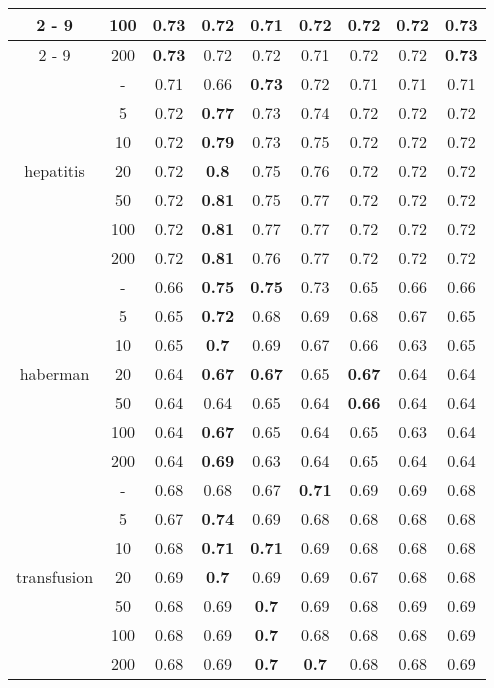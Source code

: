\documentclass{article}%
\begin{document}
\begin{longtable}{c|c|ccccccc}
\cline{2%
-%
9}%
&100&\textbf{0.73}&0.72&0.71&0.72&0.72&0.72&\textbf{0.73}\\%
\cline{2%
-%
9}%
&200&\textbf{0.73}&0.72&0.72&0.71&0.72&0.72&\textbf{0.73}\\%
\hline%
\multirow{7}{*}{hepatitis}&{-}&0.71&0.66&\textbf{0.73}&0.72&0.71&0.71&0.71\\%
\cline{2%
-%
9}%
&5&0.72&\textbf{0.77}&0.73&0.74&0.72&0.72&0.72\\%
\cline{2%
-%
9}%
&10&0.72&\textbf{0.79}&0.73&0.75&0.72&0.72&0.72\\%
\cline{2%
-%
9}%
&20&0.72&\textbf{0.8}&0.75&0.76&0.72&0.72&0.72\\%
\cline{2%
-%
9}%
&50&0.72&\textbf{0.81}&0.75&0.77&0.72&0.72&0.72\\%
\cline{2%
-%
9}%
&100&0.72&\textbf{0.81}&0.77&0.77&0.72&0.72&0.72\\%
\cline{2%
-%
9}%
&200&0.72&\textbf{0.81}&0.76&0.77&0.72&0.72&0.72\\%
\hline%
\multirow{7}{*}{haberman}&{-}&0.66&\textbf{0.75}&\textbf{0.75}&0.73&0.65&0.66&0.66\\%
\cline{2%
-%
9}%
&5&0.65&\textbf{0.72}&0.68&0.69&0.68&0.67&0.65\\%
\cline{2%
-%
9}%
&10&0.65&\textbf{0.7}&0.69&0.67&0.66&0.63&0.65\\%
\cline{2%
-%
9}%
&20&0.64&\textbf{0.67}&\textbf{0.67}&0.65&\textbf{0.67}&0.64&0.64\\%
\cline{2%
-%
9}%
&50&0.64&0.64&0.65&0.64&\textbf{0.66}&0.64&0.64\\%
\cline{2%
-%
9}%
&100&0.64&\textbf{0.67}&0.65&0.64&0.65&0.63&0.64\\%
\cline{2%
-%
9}%
&200&0.64&\textbf{0.69}&0.63&0.64&0.65&0.64&0.64\\%
\hline%
\multirow{7}{*}{transfusion}&{-}&0.68&0.68&0.67&\textbf{0.71}&0.69&0.69&0.68\\%
\cline{2%
-%
9}%
&5&0.67&\textbf{0.74}&0.69&0.68&0.68&0.68&0.68\\%
\cline{2%
-%
9}%
&10&0.68&\textbf{0.71}&\textbf{0.71}&0.69&0.68&0.68&0.68\\%
\cline{2%
-%
9}%
&20&0.69&\textbf{0.7}&0.69&0.69&0.67&0.68&0.68\\%
\cline{2%
-%
9}%
&50&0.68&0.69&\textbf{0.7}&0.69&0.68&0.69&0.69\\%
\cline{2%
-%
9}%
&100&0.68&0.69&\textbf{0.7}&0.68&0.68&0.68&0.69\\%
\cline{2%
-%
9}%
&200&0.68&0.69&\textbf{0.7}&\textbf{0.7}&0.68&0.68&0.69\\%

\end{longtable}
\end{document}
